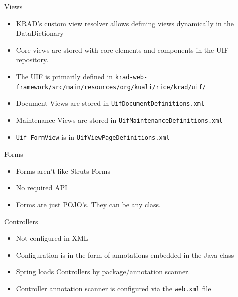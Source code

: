 \documentclass[xcolor=dvipsnames,14pt,professionalfonts]{beamer}
\begin{document}
\begin{frame}{Views}
  \begin{itemize}
    \item KRAD's custom view resolver allows defining views
      dynamically in the DataDictionary
    \item Core views are stored with core elements and components in
      the UIF repository.
    \item The UIF is primarily defined in
      \texttt{\scriptsize{krad-web-framework/src/main/resources/org/kuali/rice/krad/uif/}}
    \item Document Views are stored in
      \texttt{UifDocumentDefinitions.xml}
    \item Maintenance Views are stored in
      \texttt{UifMaintenanceDefinitions.xml}
    \item \texttt{Uif-FormView} is in \texttt{UifViewPageDefinitions.xml}
  \end{itemize}
\end{frame}

\begin{frame}{Forms}
  \begin{itemize}
    \item Forms aren't like Struts Forms
    \item No required API
    \item Forms are just POJO's.  They can be any class.
  \end{itemize}
\end{frame}

\begin{frame}{Controllers}
  \begin{itemize}
    \item Not configured in XML
    \item Configuration is in the form of annotations embedded in the
      Java class
    \item Spring loads Controllers by package/annotation scanner.
    \item Controller annotation scanner is configured via the
      \texttt{web.xml} file
  \end{itemize}
\end{frame}
\end{document}

